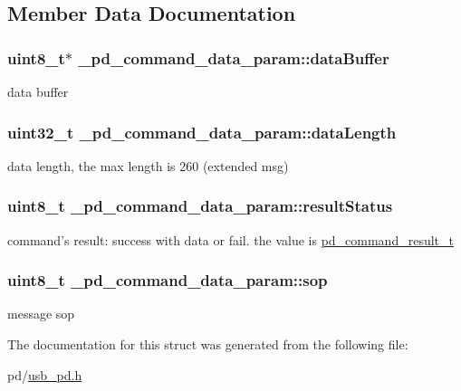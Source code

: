 \subsection{Member Data Documentation}
\hypertarget{struct__pd__command__data__param_a208a0a5b69c2c44eaa616e4e1d6b77ee}{
\subsubsection[{data\-Buffer}]{\setlength{\rightskip}{0pt plus 5cm}uint8\-\_\-t$\ast$ \-\_\-pd\-\_\-command\-\_\-data\-\_\-param\-::data\-Buffer}}\label{struct__pd__command__data__param_a208a0a5b69c2c44eaa616e4e1d6b77ee}
data buffer \hypertarget{struct__pd__command__data__param_a1ebd3619e990184cbc131f98137e3447}{
\subsubsection[{data\-Length}]{\setlength{\rightskip}{0pt plus 5cm}uint32\-\_\-t \-\_\-pd\-\_\-command\-\_\-data\-\_\-param\-::data\-Length}}\label{struct__pd__command__data__param_a1ebd3619e990184cbc131f98137e3447}
data length, the max length is 260 (extended msg) \hypertarget{struct__pd__command__data__param_ae615100fed31d9a3b0d14df3e88b427f}{
\subsubsection[{result\-Status}]{\setlength{\rightskip}{0pt plus 5cm}uint8\-\_\-t \-\_\-pd\-\_\-command\-\_\-data\-\_\-param\-::result\-Status}}\label{struct__pd__command__data__param_ae615100fed31d9a3b0d14df3e88b427f}
command's result\-: success with data or fail. the value is \hyperlink{group__usb__pd__stack_ga59917b1485caba4dd8d9b65ca5a5fd92}{pd\-\_\-command\-\_\-result\-\_\-t} \hypertarget{struct__pd__command__data__param_abc162486c37792c444d2ea46da2c27ed}{
\subsubsection[{sop}]{\setlength{\rightskip}{0pt plus 5cm}uint8\-\_\-t \-\_\-pd\-\_\-command\-\_\-data\-\_\-param\-::sop}}\label{struct__pd__command__data__param_abc162486c37792c444d2ea46da2c27ed}
message sop 

The documentation for this struct was generated from the following file\-:\begin{DoxyCompactItemize}
\item 
pd/\hyperlink{usb__pd_8h}{usb\-\_\-pd.\-h}\end{DoxyCompactItemize}

